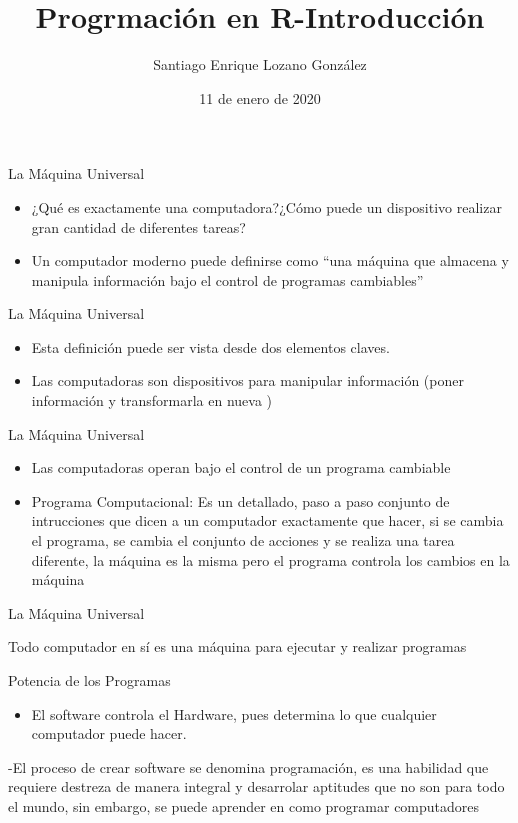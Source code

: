 \documentclass[ignorenonframetext,]{beamer}
\title{Progrmación en R-Introducción}
\author[Santiago E. Lozano G.]{Santiago Enrique Lozano González}
\date{11 de enero de 2020}
\institute[UniPiloto]{Universidad Pilot de Colombia Seccional Alto Magdalena}
\providecommand{\tightlist}{%
  \setlength{\itemsep}{0pt}\setlength{\parskip}{0pt}}
\begin{document}
\frame{\titlepage}

\begin{frame}{La Máquina Universal}

\begin{itemize}
\item
  ¿Qué es exactamente una computadora?¿Cómo puede un dispositivo
  realizar gran cantidad de diferentes tareas?
\item
  Un computador moderno puede definirse como ``una máquina que almacena
  y manipula información bajo el control de programas cambiables''
\end{itemize}

\end{frame}

\begin{frame}{La Máquina Universal}

\begin{itemize}
\item
  Esta definición puede ser vista desde dos elementos claves.
\item
  Las computadoras son dispositivos para manipular información (poner
  información y transformarla en nueva )
\end{itemize}

\end{frame}

\begin{frame}{La Máquina Universal}

\begin{itemize}
\item
  Las computadoras operan bajo el control de un programa cambiable
\item
  Programa Computacional: Es un detallado, paso a paso conjunto de
  intrucciones que dicen a un computador exactamente que hacer, si se
  cambia el programa, se cambia el conjunto de acciones y se realiza una
  tarea diferente, la máquina es la misma pero el programa controla los
  cambios en la máquina
\end{itemize}

\end{frame}

\begin{frame}{La Máquina Universal}

Todo computador en sí es una máquina para ejecutar y realizar programas

\end{frame}

\begin{frame}{Potencia de los Programas}

\begin{itemize}
\tightlist
\item
  El software controla el Hardware, pues determina lo que cualquier
  computador puede hacer.
\end{itemize}

-El proceso de crear software se denomina programación, es una habilidad
que requiere destreza de manera integral y desarrolar aptitudes que no
son para todo el mundo, sin embargo, se puede aprender en como programar
computadores

\end{frame}
\end{document}
